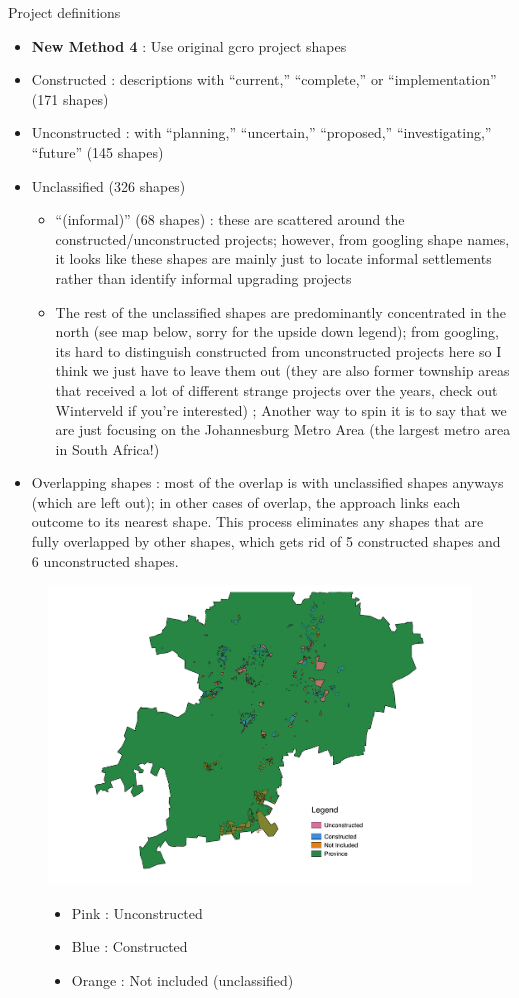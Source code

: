 \documentclass[12pt]{article}
\begin{document}
Project definitions

\begin{itemize}
    \item \textbf{New Method 4} : Use original gcro project shapes
    \item Constructed : descriptions with ``current,'' ``complete,'' or ``implementation'' (171 shapes)
    \item Unconstructed : with ``planning,'' ``uncertain,'' ``proposed,'' ``investigating,'' ``future'' (145 shapes)
    \item Unclassified (326 shapes) 
        \begin{itemize}
            \item ``(informal)'' (68 shapes) : these are scattered around the constructed/unconstructed projects; however, from googling shape names, it looks like these shapes are mainly just to locate informal settlements rather than identify informal upgrading projects
            \item The rest of the unclassified shapes are predominantly concentrated in the north (see map below, sorry for the upside down legend);  from googling, its hard to distinguish constructed from unconstructed projects here so I think we just have to leave them out  (they are also former township areas that received a lot of different strange projects over the years, check out Winterveld if you're interested) ; Another way to spin it is to say that we are just focusing on the Johannesburg Metro Area (the largest metro area in South Africa!)
        \end{itemize}
    \item Overlapping shapes : most of the overlap is with unclassified shapes anyways (which are left out); in other cases of overlap, the approach links each outcome to its nearest shape.  This process eliminates any shapes that are fully overlapped by other shapes, which gets rid of 5 constructed shapes and 6 unconstructed shapes.

\end{itemize}


\begin{figure}
\begin{center}
\includegraphics[scale=.7,angle=180,origin=c]{new_map.pdf}
\end{center}
\begin{itemize}
\item Pink : Unconstructed
\item Blue : Constructed
\item Orange : Not included (unclassified) 
\end{itemize}
\end{figure}
\end{document}
